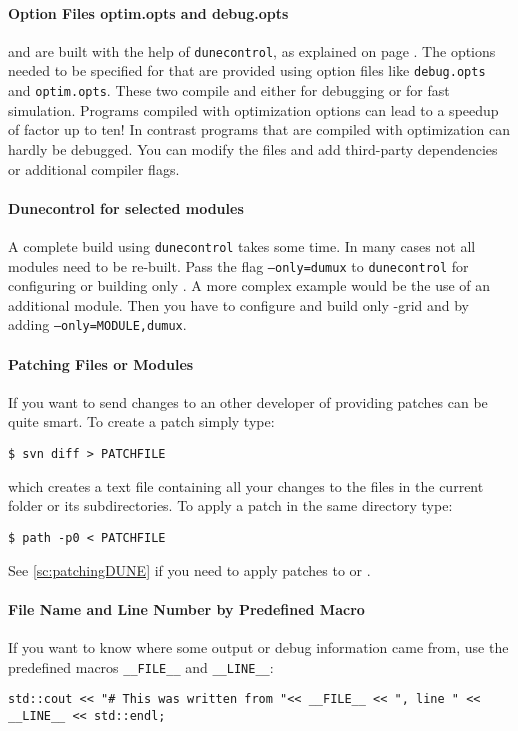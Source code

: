 \paragraph{Option Files optim.opts and debug.opts}
\Dune and \Dumux are built with the help of \texttt{dunecontrol}, as explained on page \pageref{buildIt}.
The options needed to be specified for that are provided using option files like
\texttt{debug.opts} and \texttt{optim.opts}. These two compile \Dune and \Dumux
either for debugging or for fast simulation. Programs compiled with optimization options
can lead to a speedup of factor up to ten!
In contrast programs that are compiled with optimization can hardly be debugged.
You can modify the files and add third-party dependencies or additional compiler flags.


\paragraph{Dunecontrol for selected modules}
A complete build using \texttt{dunecontrol} takes some time. In many cases not all modules need to be re-built.
Pass the flag \texttt{--only=dumux} to \texttt{dunecontrol} for configuring or building only \Dumux. A more
complex example would be the use of an additional module. Then you have to configure and build only \Dune{}-grid
and \Dumux by adding \texttt{--only=MODULE,dumux}.

\paragraph{Patching Files or Modules}
If you want to send changes to an other developer of \Dumux providing patches
can be quite smart. To create a patch simply type:
\begin{lstlisting}[style=Bash]
$ svn diff > PATCHFILE
\end{lstlisting}
\noindent which creates a text file containing all your changes to the files
in the current folder or its subdirectories.
To apply a patch in the same directory type:
\begin{lstlisting}[style=Bash]
$ path -p0 < PATCHFILE
\end{lstlisting}
See \ref{sc:patchingDUNE} if you need to apply patches to \Dumux or \Dune.

\paragraph{File Name and Line Number by Predefined Macro}
If you want to  know where some output or debug information came from, use the predefined
macros \texttt{\_\_FILE\_\_} and \texttt{\_\_LINE\_\_}:
\begin{lstlisting}[style=DumuxCode]
std::cout << "# This was written from "<< __FILE__ << ", line " << __LINE__ << std::endl;
\end{lstlisting}

